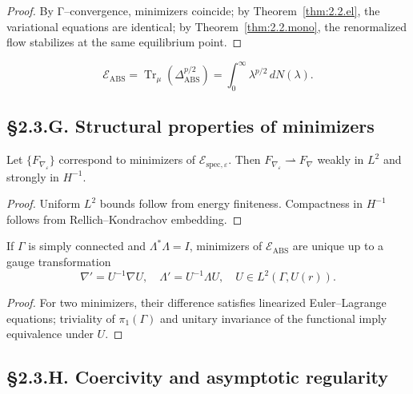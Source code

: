 \begin{proof}
By Γ–convergence, minimizers coincide; by Theorem~\ref{thm:2.2.el}, the variational equations are identical; by Theorem~\ref{thm:2.2.mono}, the renormalized flow stabilizes at the same equilibrium point.
\end{proof}

\begin{corollary}
\[
\mathcal{E}_{\mathrm{ABS}}
 = \operatorname{Tr}_\mu(\Delta_{\mathrm{ABS}}^{p/2})
 = \int_0^\infty \lambda^{p/2}\, dN(\lambda).
\]
\end{corollary}

\subsection*{§2.3.G. Structural properties of minimizers}

\begin{lemma}\label{lem:2.3.curv}
Let $\{F_{\nabla_\varepsilon}\}$ correspond to minimizers of $\mathcal{E}_{\mathrm{spec},\varepsilon}$.  
Then $F_{\nabla_\varepsilon}\rightharpoonup F_\nabla$ weakly in $L^2$ and strongly in $H^{-1}$.
\end{lemma}

\begin{proof}
Uniform $L^2$ bounds follow from energy finiteness.  
Compactness in $H^{-1}$ follows from Rellich–Kondrachov embedding.
\end{proof}

\begin{theorem}\label{thm:2.3.gauge}
If $\Gamma$ is simply connected and $\Lambda^\ast\Lambda=I$, minimizers of $\mathcal{E}_{\mathrm{ABS}}$ are unique up to a gauge transformation
\[
\nabla' = U^{-1}\nabla U,
\quad
\Lambda' = U^{-1}\Lambda U,
\quad
U\in L^2(\Gamma,U(r)).
\]
\end{theorem}

\begin{proof}
For two minimizers, their difference satisfies linearized Euler–Lagrange equations; triviality of $\pi_1(\Gamma)$ and unitary invariance of the functional imply equivalence under $U$.
\end{proof}

\subsection*{§2.3.H. Coercivity and asymptotic regularity}

